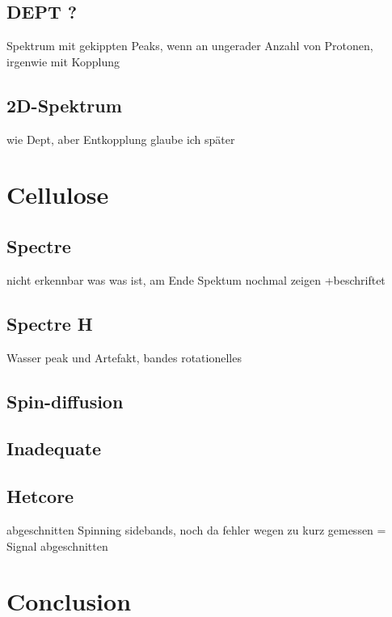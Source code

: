 \documentclass[a4paper,12pt]{scrartcl}
\begin{document}
  \subsection{DEPT ?}
   Spektrum mit gekippten Peaks, wenn an ungerader Anzahl von Protonen, irgenwie mit Kopplung

  \subsection{2D-Spektrum}
   wie Dept, aber Entkopplung glaube ich später
 
 

 \section{Cellulose}
  \subsection{Spectre }
   nicht erkennbar was was ist, am Ende Spektum nochmal zeigen +beschriftet  

  \subsection{Spectre H}
   Wasser peak und Artefakt, bandes rotationelles

  \subsection{Spin-diffusion}
  
  \subsection{Inadequate}

  \subsection{Hetcore}
 
   abgeschnitten Spinning sidebands, noch da fehler wegen zu kurz gemessen = Signal abgeschnitten
 
 

 \section{Conclusion}
 
 
\end{document}

